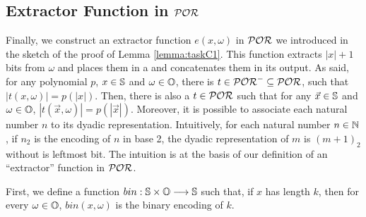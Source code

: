 \subsection{Extractor Function in $\mathcal{POR}$}\label{sec:E}
Finally, we construct an extractor function $e(x, \omega)$ in $\mathcal{POR}$
we introduced in the sketch of the proof of Lemma \ref{lemma:taskC1}.
%
This function extracts $|x|+1$ bits from $\omega$ and places them in a
and concatenates them in its output.
%
%
As said, for any polynomial $p$, $x\in \mathbb{S}$ and $\omega\in\mathbb{O}$,
there is $t\in \mathcal{POR}^-\subseteq \mathcal{POR}$, %
such that
$|t(x,\omega)|=p(|x|)$.
Then, there is also a $t \in \mathcal{POR}$ such that
for any $\vec{x} \in \mathbb{S}$ and $\omega \in \mathbb{O}$,
$|t(\vec{x},\omega)|= p(|\vec{x}|)$.
%
Moreover, it is possible to associate each natural
number $n$ to its dyadic representation.
Intuitively, for each natural number $n\in \mathbb{N}$,
if $n_2$ is the encoding of $n$ in base 2,
the dyadic representation of $m$ is $(m+1)_2$ without is leftmost bit.
%
The intuition is at the basis of our definition
of an ``extractor'' function in $\mathcal{POR}$.











First, we define a function $bin:\mathbb{S}\times \mathbb{O}\longrightarrow \mathbb{S}$
such that, if $x$ has length $k$,
then for every $\omega\in \mathbb{O}$,
$bin(x,\omega)$ is the binary encoding of $k$.





